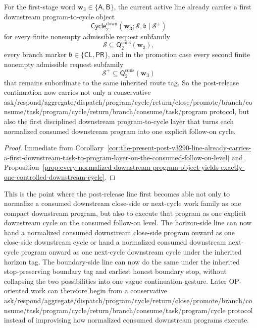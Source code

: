 \begin{corollary}
\label{cor:the-present-post-v3290-line-already-carries-a-first-downstream-program-to-cycle-layer-on-the-consumed-follow-on-level}
For the first-stage word \(\mathbf w_3\in\{\mathsf A,\mathsf B\}\), the current active line already carries a first downstream program-to-cycle object
\[
  \mathsf{Cycle}^{\mathrm{down}}_{2}(\mathbf w_3;\mathcal S,\mathfrak b\mid\mathcal S^{+})
\]
for every finite nonempty admissible request subfamily
\[
  \mathcal S\subseteq \mathsf{Q}^{\mathrm{cons}}_{2}(\mathbf w_3),
\]
every branch marker \(\mathfrak b\in\{\mathsf{CL},\mathsf{PR}\}\), and in the promotion case every second finite nonempty admissible request subfamily
\[
  \mathcal S^{+}\subseteq \mathsf{Q}^{\mathrm{cons}}_{2}(\mathbf w_3)
\]
that remains subordinate to the same inherited route tag. So the post-release continuation now carries not only a conservative ask/respond/aggregate/dispatch/program/cycle/return/close/promote/branch/consume/task/program/cycle/return/branch/consume/task/program protocol, but also the first disciplined downstream program-to-cycle layer that turns each normalized consumed downstream program into one explicit follow-on cycle.
\end{corollary}

\begin{proof}
Immediate from Corollary~\ref{cor:the-present-post-v3290-line-already-carries-a-first-downstream-task-to-program-layer-on-the-consumed-follow-on-level} and Proposition~\ref{prop:every-normalized-downstream-program-object-yields-exactly-one-controlled-downstream-cycle}.
\end{proof}

\begin{remark}
\label{rem:what-the-first-downstream-program-to-cycle-layer-on-the-consumed-follow-on-level-now-buys}
This is the point where the post-release line first becomes able not only to normalize a consumed downstream close-side or next-cycle work family as one compact downstream program, but also to execute that program as one explicit downstream cycle on the consumed follow-on level. The horizon-side line can now hand a normalized consumed downstream close-side program onward as one close-side downstream cycle or hand a normalized consumed downstream next-cycle program onward as one next-cycle downstream cycle under the inherited horizon tag. The boundary-side line can now do the same under the inherited stop-preserving boundary tag and earliest honest boundary stop, without collapsing the two possibilities into one vague continuation gesture. Later OP-oriented work can therefore begin from a conservative ask/respond/aggregate/dispatch/program/cycle/return/close/promote/branch/consume/task/program/cycle/return/branch/consume/task/program/cycle protocol instead of improvising how normalized consumed downstream programs execute.
\end{remark}


